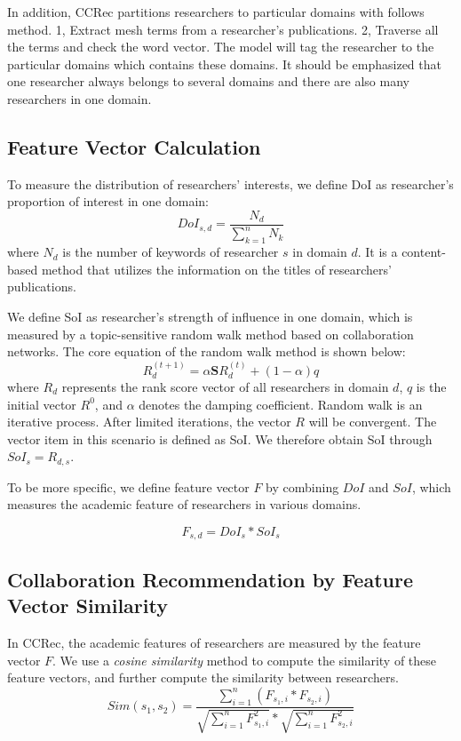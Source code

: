 \documentclass{acm_proc_article-sp}
\begin{document}
In addition, CCRec partitions researchers to particular domains with follows method. 1, Extract mesh terms from a researcher's publications. 2, Traverse all the terms and check the word vector. The model will tag the researcher to the particular domains which contains these domains. It should be emphasized that one researcher always belongs to several domains and there are also many researchers in one domain.

\subsection{Feature Vector Calculation}
To measure the distribution of researchers' interests, we define DoI as researcher's proportion of interest in one domain:
\begin{equation}
DoI_{s,d}=\frac{N_{d}}{\sum_{k=1}^{n} N_{k}}
\end{equation}
where $N_{d}$ is the number of keywords of researcher $s$ in domain $d$. It is a content-based method that utilizes the information on the titles of researchers' publications.

We define SoI as researcher's strength of influence in one domain, which is measured by a topic-sensitive random walk method based on collaboration networks. The core equation of the random walk method is shown below:
\begin{equation}
R_{d}^{(t+1)}=\alpha \mathbf{S}R_{d}^{(t)}+(1-\alpha)q
\end{equation}
where $R_{d}$ represents the rank score vector of all researchers in domain $d$, $q$ is the initial vector $R^0$, and $\alpha$ denotes the damping coefficient. Random walk is an iterative process. After limited iterations, the vector $R$ will be convergent. The vector item in this scenario is defined as SoI. We therefore obtain SoI through $SoI_{s}=R_{d,s}$.

To be more specific, we define feature vector $F$ by combining $DoI$ and $SoI$, which measures the academic feature of researchers in various domains.

\begin{equation}
F_{s,d}=DoI_{s}*SoI_{s}
\end{equation}

\subsection{Collaboration Recommendation by Feature Vector Similarity}
In CCRec, the academic features of researchers are measured by the feature vector $F$. We use a \emph{cosine similarity} method to compute the similarity of these feature vectors, and further compute the similarity between researchers.
\begin{equation}
Sim(s_{1},s_{2})=\frac{\sum_{i=1}^{n}(F_{s_{1},i}*F_{s_{2},i})}{\sqrt{\sum_{i=1}^{n}F_{s_{1},i}^2}*\sqrt{\sum_{i=1}^{n}F_{s_{2},i}^2}}
\end{equation}
\end{document}
